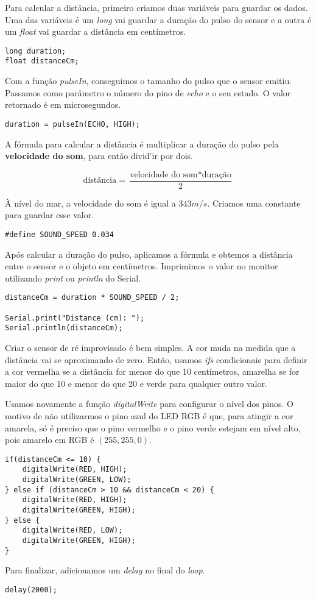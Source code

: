 Para calcular a distância, primeiro criamos duas variáveis para guardar os dados. Uma das variáveis é um \textit{long} vai guardar a duração do pulso do sensor e a outra é um \textit{float} vai guardar a distância em centímetros. 

\begin{lstlisting}
long duration;
float distanceCm;
\end{lstlisting}

Com a função \textit{pulseIn}, conseguimos o tamanho do pulso que o sensor emitiu. Passamos como parâmetro o número do pino de \textit{echo} e o seu estado. O valor retornado é em microsegundos.

\begin{lstlisting}
duration = pulseIn(ECHO, HIGH);
\end{lstlisting}

A fórmula para calcular a distância é multiplicar a duração do pulso pela \textbf{velocidade do som}, para então divid'ir por dois. 

$$\text{distância} = \frac{\text{velocidade do som} * \text{duração}}{2}$$

À nível do mar, a velocidade do som é igual a $343 m/s$. Criamos uma constante para guardar esse valor.

\begin{lstlisting}
#define SOUND_SPEED 0.034
\end{lstlisting}

Após calcular a duração do pulso, aplicamos a fórmula e obtemos a distância entre o sensor e o objeto em centímetros. Imprimimos o valor no monitor utilizando \textit{print} ou \textit{println} do Serial.

\begin{lstlisting}
distanceCm = duration * SOUND_SPEED / 2;

Serial.print("Distance (cm): ");
Serial.println(distanceCm);
\end{lstlisting}

Criar o sensor de ré improvisado é bem simples. A cor muda na medida que a distância vai se aproximando de zero. Então, usamos \textit{ifs} condicionais para definir a cor vermelha se a distância for menor do que 10 centímetros, amarelha se for maior do que 10 e menor do que 20 e verde para qualquer outro valor.

Usamos novamente a função \textit{digitalWrite} para configurar o nível dos pinos. O motivo de não utilizarmos o pino azul do LED RGB é que, para atingir a cor amarela, só é preciso que o pino vermelho e o pino verde estejam em nível alto, pois amarelo em RGB é $(255, 255, 0)$.

\begin{lstlisting}
if(distanceCm <= 10) {
    digitalWrite(RED, HIGH);
    digitalWrite(GREEN, LOW);
} else if (distanceCm > 10 && distanceCm < 20) {
    digitalWrite(RED, HIGH);
    digitalWrite(GREEN, HIGH);
} else {
    digitalWrite(RED, LOW);
    digitalWrite(GREEN, HIGH);
}
\end{lstlisting}

Para finalizar, adicionamos um \textit{delay} no final do \textit{loop}.

\begin{lstlisting}
delay(2000);
\end{lstlisting}